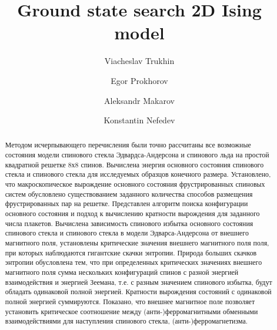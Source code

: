 \documentclass[utf8, babel, sor, jor, amsmath, amssymb, reprint]{elsarticle} %
\begin{document}
\begin{frontmatter}


\title{Ground state search 2D Ising model}

\author[mainaddress, secondaryaddress]{Viacheslav Trukhin}

\author[mainaddress]{Egor Prokhorov}

\author[mainaddress, secondaryaddress]{Aleksandr Makarov}

\author[mainaddress, secondaryaddress]{Konstantin Nefedev}


\address[mainaddress]{Far Eastern Federal University, Vladivostok, Russky Island, 10 Ajax Bay, 690922, the Russian Federation}
\address[secondaryaddress]{Institute of Applied Mathematics, Far Eastern Branch, Russian Academy of Science, Vladivostok, Radio 7, 690041, the Russian Federation}

\begin{abstract}

Методом исчерпывающего перечисления были точно рассчитаны все возможные состояния модели спинового стекла Эдвардса-Андерсона и спинового льда на простой квадратной решетке 8х8 спинов. Вычислена энергия основного состояния спинового стекла и спинового стекла для исследуемых образцов конечного размера. Установлено, что макроскопическое вырождение основного состояния фрустрированных спиновых систем обусловлено существованием заданного количества способов размещения фрустрированных пар на решетке. Представлен алгоритм поиска конфигурации основного состояния и подход к вычислению кратности вырождения для заданного числа плакетов. Вычислена зависимость спинового избытка основного состояния спинового стекла и спинового стекла в модели Эдварса-Андерсона от внешнего магнитного поля, установлены критические значения внешнего магнитного поля поля, при которых наблюдаются гигантские скачки энтропии. Природа больших скачков энтропии обусловлена тем, что при определенных критических значениях внешнего магнитного поля сумма нескольких конфигураций спинов с разной энергией взаимодействия и энергией Зеемана, т.е. с разным значением спинового избытка, будут обладать одинаковой полной энергией. Кратности вырождения состояний с одинаковой полной энергией суммируются. Показано, что внешнее магнитное поле позволяет установить критическое соотношение между (анти-)ферромагнитными обменными взаимодействиями для наступления спинового стекла, (анти-)ферромагнетизма.  


\end{abstract}
\end{frontmatter}
\end{document}
